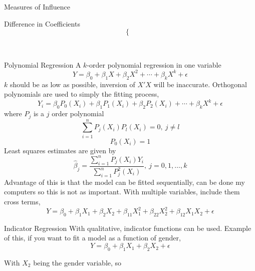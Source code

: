 \documentclass{article}
\begin{document}
\begin{multicols*}{3}
\begin{blackbox}{Measures of Influence}
\begin{brownbox}{Difference in Coefficients}
\[\begin{cases}
            \end{cases}\]
        \end{brownbox}\\[-2ex]
    \end{blackbox}
    \begin{blackbox}{Polynomial Regression}
        A $k$-order polynomial regression in one variable \\[-2ex]
        \[Y = \beta_0 + \beta_1X + \beta_2X^2 + \cdots + \beta_kX^k + \epsilon\]
        $k$ should be as low as possible, inversion of $X'X$ will be inaccurate. Orthogonal polynomials are used to simply the fitting process,\\[-3ex]
        \[Y_i = \beta_0P_0(X_i) +  \beta_1P_1(X_i) + \beta_2P_2(X_i) + \cdots + \beta_kX^k + \epsilon\]
        where $P_j$ is a $j$ order polynomial\\[-3ex]
        \[\sum_{i=1}^n P_j(X_i)P_l(X_i) = 0, \ j\neq l\]
        \[P_0(X_i) = 1\]
        Least squares estimates are given by \\[-2ex]
        \[\hat{\beta}_j = \frac{\sum_{i=1}^n P_j(X_i)Y_i}{\sum_{i=1}^n P_j^2(X_i)}, \ j=0,1,\ldots,k\]
        Advantage of this is that the model can be fitted sequentially, can be done my computers so this is not as important. With multiple variables, include them cross terms,\\[-5ex]
        \[Y = \beta_0 + \beta_1X_1 + \beta_2X_2 + \beta_{11}X_1^2 + \beta_{22}X_2^2 + \beta_{12}X_1X_2 + \epsilon\]
        \begin{brownbox}{Indicator Regression}
            With qualitative, indicator functions can be used. 
            Example of this, if you want to fit a model as a function of gender,\\[-3ex]
            \[Y = \beta_0 + \beta_1X_1 + \beta_2X_2 + \epsilon\]

            With $X_2$ being the gender variable, so \\[-4ex]


\end{brownbox}
\end{blackbox}
\end{multicols*}
\end{document}

